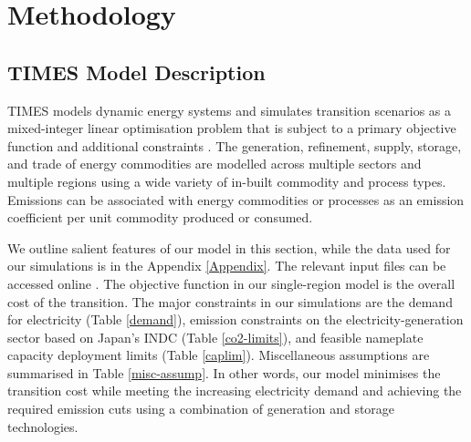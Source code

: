 \section{Methodology} \label{method}
\subsection{TIMES Model Description}
\gls{TIMES} models dynamic energy systems and simulates transition scenarios as a mixed-integer linear optimisation problem that is subject to a primary objective function and additional constraints \cite{loulou_etsap-tiam_2008}. The generation, refinement, supply, storage, and trade of energy commodities are modelled across multiple sectors and multiple regions using a wide variety of in-built commodity and process types. Emissions can be associated with energy commodities or processes as an emission coefficient per unit commodity produced or consumed. 

We outline salient features of our model in this section, while the data used for our simulations is in the Appendix \ref{Appendix}. The relevant input files can be accessed online \cite{chaube_arfci2cner_2021}. The objective function in our single-region model is the overall cost of the transition. The major constraints in our simulations are the demand for electricity (Table \ref{demand}), emission constraints on the electricity-generation sector based on Japan's \gls{INDC} (Table \ref{co2-limits}), and feasible nameplate capacity deployment limits (Table \ref{caplim}). Miscellaneous assumptions are summarised in Table \ref{misc-assump}. In other words, our model minimises the transition cost while meeting the increasing electricity demand and achieving the required emission cuts using a combination of generation and storage technologies. 

